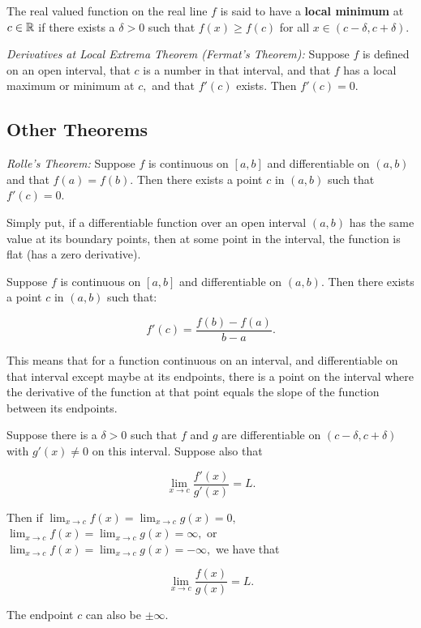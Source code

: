\documentclass{article}
\begin{document}
The real valued function on the real line $f$ is said to have a \textbf{local minimum} at $c \in \mathbb{R}$ if there exists a $\delta > 0$ such that $f(x) \geq f(c)$ for all $x \in (c - \delta, c + \delta).$

\emph{Derivatives at Local Extrema Theorem (Fermat's Theorem):} Suppose $f$ is defined on an open interval, that $c$ is a number in that interval, and that $f$ has a local maximum or minimum at $c,$ and that $f'(c)$ exists. Then $f'(c) = 0.$

\subsection{Other Theorems}

\emph{Rolle's Theorem:} Suppose $f$ is \@{continuous} on $[a,b]$ and \@{differentiable} on $(a,b)$ and that $f(a) = f(b).$ Then there exists a point $c$ in $(a,b)$ such that $f'(c) = 0.$

Simply put, if a differentiable function over an open interval $(a,b)$ has the same value at its boundary points, then at some point in the interval, the function is flat (has a zero derivative).

\begin{theorem}
Suppose $f$ is \@{continuous} on $[a,b]$ and \@{differentiable} on $(a,b).$ Then there exists a point $c$ in $(a,b)$ such that:

\[ f'(c) = \frac{f(b) - f(a)}{b-a}. \]

This means that for a function continuous on an interval, and differentiable on that interval except maybe at its endpoints, there is a point on the interval where the derivative of the function at that point equals the slope of the function between its endpoints.
\end{theorem}

\begin{theorem}[L'Hospital]
Suppose there is a $\delta > 0$ such that $f$ and $g$ are differentiable on $(c  - \delta, c + \delta)$ with $g'(x) \neq 0$ on this interval. Suppose also that

\[ \lim_{x \to c} \frac{f'(x)}{g'(x)} = L. \]

Then if $\lim_{x \to c}f(x) = \lim_{x \to c}g(x) = 0,$ $\lim_{x \to c}f(x) = \lim_{x \to c}g(x) = \infty,$ or $\lim_{x \to c}f(x) = \lim_{x \to c}g(x) = -\infty,$ we have that

\[ \lim_{x \to c} \frac{f(x)}{g(x)} = L. \]

The endpoint $c$ can also be $\pm \infty.$
\end{theorem}
\end{document}
